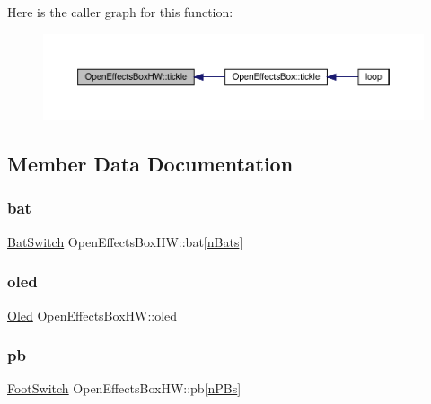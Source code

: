 Here is the caller graph for this function\+:\nopagebreak
\begin{figure}[H]
\begin{center}
\leavevmode
\includegraphics[width=350pt]{class_open_effects_box_h_w_a4623ed8f605ab7d6a4abedf6879f06ac_icgraph}
\end{center}
\end{figure}


\subsection{Member Data Documentation}
\mbox{\label{class_open_effects_box_h_w_a705b1a8313c014b390897bbc7a7a21a0}} 
\subsubsection{\texorpdfstring{bat}{bat}}
{\footnotesize\ttfamily \mbox{\hyperlink{class_bat_switch}{Bat\+Switch}} Open\+Effects\+Box\+H\+W\+::bat\mbox{[}\mbox{\hyperlink{_open_effects_box_h_w_8h_a36382b6deaaa10e505e0426701830964}{n\+Bats}}\mbox{]}}

\mbox{\label{class_open_effects_box_h_w_a567084cd766ac8fa8966e6b8f749f210}} 
\subsubsection{\texorpdfstring{oled}{oled}}
{\footnotesize\ttfamily \mbox{\hyperlink{class_oled}{Oled}} Open\+Effects\+Box\+H\+W\+::oled}

\mbox{\label{class_open_effects_box_h_w_a8d03d86b0d55c135f413a86fff56393c}} 
\subsubsection{\texorpdfstring{pb}{pb}}
{\footnotesize\ttfamily \mbox{\hyperlink{class_foot_switch}{Foot\+Switch}} Open\+Effects\+Box\+H\+W\+::pb\mbox{[}\mbox{\hyperlink{_open_effects_box_h_w_8h_a66b2de1f056e3372214c3244690b509f}{n\+P\+Bs}}\mbox{]}}


